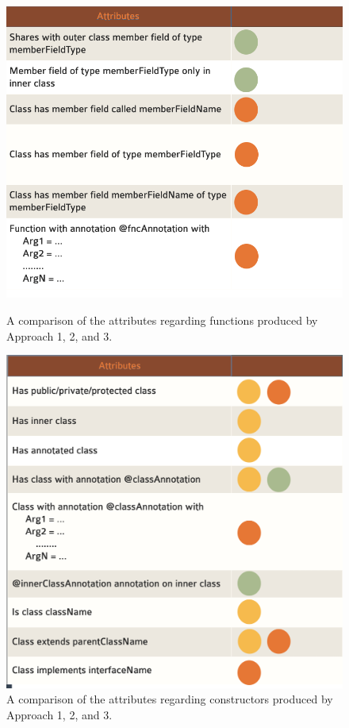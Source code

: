 \documentclass[12pt]{article}
\begin{document}
\begin{figure}
\centering
\parbox{7.5 cm}{
\includegraphics[width=\linewidth]{attributeFields.png}
\caption{A comparison of the attributes regarding functions produced by Approach 1, 2, and 3.}
\label{fig:attrField}}
\qquad
\begin{minipage}{8 cm}
\includegraphics[width=\linewidth]{attributeClass.png}
\caption{A comparison of the attributes regarding constructors produced by Approach 1, 2, and 3.}
\label{fig:attrClass}
\end{minipage}
\end{figure}
\end{document}

